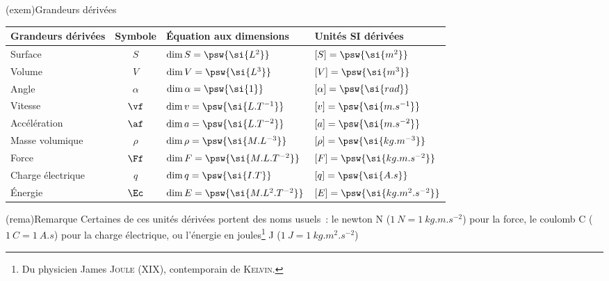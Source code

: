 \documentclass[../main/main.tex]{subfiles}
\begin{document}
\begin{tcb}[label=exem:grandeurs](exem){Grandeurs dérivées}
	\begin{center}
		\begin{tabular}{lcll}
			\toprule
			Grandeurs dérivées & Symbole  & Équation aux dimensions                  & Unités SI dérivées                      \\
			\midrule
			Surface            & $S$      & $\dim{S}      = \psw{\si{L^2}}$          & $ [S]      = \psw{\si{m^2}}           $ \\
			Volume             & $V$      & $\dim{V}      = \psw{\si{L^3}}$          & $ [V]      = \psw{\si{m^3}}           $ \\
			Angle              & $\alpha$ & $\dim{\alpha} = \psw{\si{1}}$            & $ [\alpha] = \psw{\si{rad}}           $ \\
			Vitesse            & $\vf$    & $\dim{v}      = \psw{\si{L.T^{-1}}}$     & $ [v]      = \psw{\si{m.s^{-1}}}      $ \\
			Accélération       & $\af$    & $\dim{a}      = \psw{\si{L.T^{-2}}}$     & $ [a]      = \psw{\si{m.s^{-2}}}      $ \\
			Masse volumique    & $\rho$   & $\dim{\rho}   = \psw{\si{M.L^{-3}}}$     & $ [\rho]   = \psw{\si{kg.m^{-3}}}     $ \\
			Force              & $\Ff$    & $\dim{F}      = \psw{\si{M.L.T^{-2}}}$   & $ [F]      = \psw{\si{kg.m.s^{-2}}}   $ \\
			Charge électrique  & $q$      & $\dim{q}      = \psw{\si{I.T}}$          & $ [q]      = \psw{\si{A.s}}           $ \\
			Énergie            & $\Ec$    & $\dim{E}      = \psw{\si{M.L^2.T^{-2}}}$ & $ [E]      = \psw{\si{kg.m^2.s^{-2}}} $ \\
			\bottomrule
		\end{tabular}
	\end{center}
\end{tcb}
\begin{tcb}(rema){Remarque}
	Certaines de ces unités dérivées portent des noms usuels~: le newton N
	($\SI{1}{N} = \SI{1}{kg.m.s^{-2}}$) pour la force, le coulomb C ($\SI{1}{C} =
		\SI{1}{A.s}$) pour la charge électrique, ou l'énergie en joules\footnote{Du
		physicien James \textsc{Joule} (\textsc{XIX}\ieme), contemporain de
		\textsc{Kelvin}.} J ($\SI{1}{J} = \SI{1}{kg.m^2.s^{-2}}$)
\end{tcb}
\end{document}
